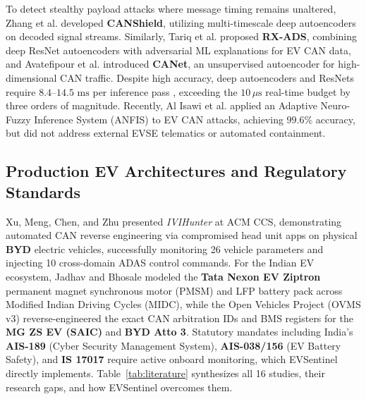 \documentclass[conference]{IEEEtran}
\begin{document}
To detect stealthy payload attacks where message timing remains unaltered, Zhang et al. \cite{zhang2022} developed \textbf{CANShield}, utilizing multi-timescale deep autoencoders on decoded signal streams. Similarly, Tariq et al. \cite{tariq2022} proposed \textbf{RX-ADS}, combining deep ResNet autoencoders with adversarial ML explanations for EV CAN data, and Avatefipour et al. \cite{avatefipour2019} introduced \textbf{CANet}, an unsupervised autoencoder for high-dimensional CAN traffic. Despite high accuracy, deep autoencoders and ResNets require $8.4\text{--}14.5\text{ ms}$ per inference pass \cite{garg2024}, exceeding the $10\,\mu\text{s}$ real-time budget by three orders of magnitude. Recently, Al Isawi et al. \cite{alisawi2025} applied an Adaptive Neuro-Fuzzy Inference System (ANFIS) to EV CAN attacks, achieving $99.6\%$ accuracy, but did not address external EVSE telematics or automated containment.

\subsection{Production EV Architectures and Regulatory Standards}
Xu, Meng, Chen, and Zhu \cite{xu2026} presented \textit{IVIHunter} at ACM CCS, demonstrating automated CAN reverse engineering via compromised head unit apps on physical \textbf{BYD} electric vehicles, successfully monitoring 26 vehicle parameters and injecting 10 cross-domain ADAS control commands. For the Indian EV ecosystem, Jadhav and Bhosale \cite{jadhav2023} modeled the \textbf{Tata Nexon EV Ziptron} permanent magnet synchronous motor (PMSM) and LFP battery pack across Modified Indian Driving Cycles (MIDC), while the Open Vehicles Project (OVMS v3) \cite{ovms2024} reverse-engineered the exact CAN arbitration IDs and BMS registers for the \textbf{MG ZS EV (SAIC)} and \textbf{BYD Atto 3}. Statutory mandates including India's \textbf{AIS-189} (Cyber Security Management System), \textbf{AIS-038/156} (EV Battery Safety), and \textbf{IS 17017} \cite{arai2024} require active onboard monitoring, which EVSentinel directly implements. Table~\ref{tab:literature} synthesizes all 16 studies, their research gaps, and how EVSentinel overcomes them.
\end{document}
